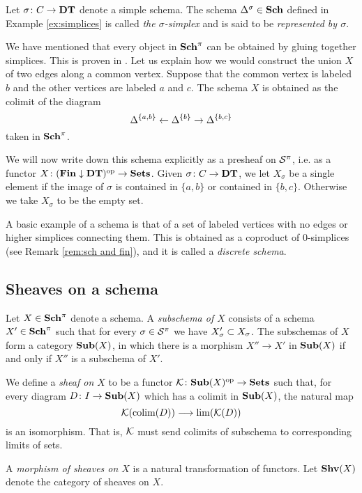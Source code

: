 \documentclass{amsart}
\begin{document}
\begin{definition}\label{def:simplex}

Let $\sigma\taking C\to\DT$ denote a simple schema.  The schema $\Delta^\sigma\in\Sch$ defined in Example \ref{ex:simplices} is called {\em the $\sigma$-simplex} and is said to be {\em represented by $\sigma$}.

\end{definition}

\begin{example}

We have mentioned that every object in $\Sch^\pi$ can be obtained by gluing together simplices.  This is proven in \cite[2.15.6]{Bor1}.  Let us explain how we would construct the union $X$ of two edges along a common vertex.  Suppose that the common vertex is labeled $b$ and the other vertices are labeled $a$ and $c$.  The schema $X$ is obtained as the colimit of the diagram $$\Delta^{\{a,b\}}\from\Delta^{\{b\}}\to\Delta^{\{b,c\}}$$ taken in $\Sch^\pi$.

We will now write down this schema explicitly as a presheaf on $\mcS^\pi$, i.e. as a functor $X\taking(\Fin\down\DT)\op\to\Sets$.  Given $\sigma\taking C\to\DT$, we let $X_\sigma$ be a single element if the image of $\sigma$ is contained in $\{a,b\}$ or contained in $\{b,c\}$.  Otherwise we take $X_\sigma$ to be the empty set.

\end{example}

\begin{example}\label{ex:discrete}

A basic example of a schema is that of a set of labeled vertices with no edges or higher simplices connecting them.  This is obtained as a coproduct of $0$-simplices (see Remark \ref{rem:sch and fin}), and it is called a {\em discrete schema}.  

\end{example}

\subsection{Sheaves on a schema}

\begin{definition}

Let $X\in\Sch^\pi$ denote a schema.  A {\em subschema of $X$} consists of a schema $X'\in\Sch^\pi$ such that for every $\sigma\in\mcS^\pi$ we have $X'_\sigma\ss X_\sigma$.  The subschemas of $X$ form a category $\Sub(X)$, in which there is a morphism $X''\to X'$ in $\Sub(X)$ if and only if $X''$ is a subschema of $X'$.  

We define a {\em sheaf on $X$} to be a functor $\mcK\taking\Sub(X)\op\to\Sets$ such that, for every diagram $D\taking I\to\Sub(X)$ which has a colimit in $\Sub(X)$, the natural map $$\mcK(\colim(D))\too\lim(\mcK(D))$$ is an isomorphism.  That is, $\mcK$ must send colimits of subschema to corresponding limits of sets.

A {\em morphism of sheaves on $X$} is a natural transformation of functors.  Let $\Shv(X)$ denote the category of sheaves on $X$.

\end{definition}
\end{document}
